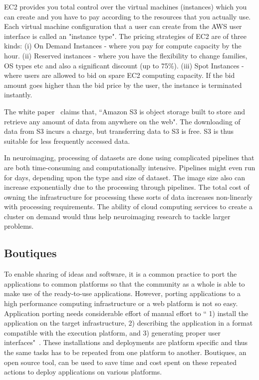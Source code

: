 EC2 provides you total control over the virtual machines (instances) which you can create and you have to pay according to the resources that you actually use. Each virtual machine configuration that a user can create from the AWS user interface is called an "instance type". The pricing strategies of EC2 are of three kinds: (i) On Demand Instances - where you pay for compute capacity by the hour. (ii) Reserved instances - where you have the flexibility to change families, OS types etc and also a significant discount (up to 75\%). (iii) Spot Instances - where users are allowed to bid on spare EC2 computing capacity. If the bid amount goes higher than the bid price by the user, the instance is terminated instantly.

The white paper~\cite{Amazon-Web-Services} claims that, ``Amazon S3 is object storage built to store and retrieve any amount of data from anywhere on the web". The downloading of data from S3 incurs a charge, but transferring data to S3 is free. S3 is thus suitable for less frequently accessed data.

In neuroimaging, processing of datasets are done using complicated pipelines that are both time-consuming and computationally intensive. Pipelines might even run for days, depending upon the type and size of dataset. The image size also can increase exponentially due to the processing through pipelines. The total cost of owning the infrastructure for processing these sorts of data increases non-linearly with processing requirements. The ability of cloud computing services to create a cluster on demand would thus help neuroimaging research to tackle larger problems.

\subsection{Boutiques}
To enable sharing of ideas and software, it is a common practice to port the applications to common platforms so that the community as a whole is able to make use of the ready-to-use applications. However, porting applications to a high performance computing infrastructure or a web platform is not so easy. Application porting needs considerable effort of manual effort to `` 1) install the application on the target infrastructure, 2) describing the application in a format compatible with the execution platform, and 3) generating proper user interfaces"~\cite{boutiques}. These installations and deployments are platform specific and thus the same tasks has to be repeated from one platform to another. Boutiques, an open source tool, can be used to save time and cost spent on these repeated actions to deploy applications on various platforms.

